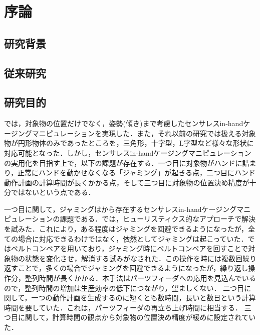 \documentclass[a4paper,twoside,12pt,papersize, dvipdfmx]{iirthesis}
\begin{document}
    \newcommand{\figref}[1]{\figurename\ref{#1}}
    \newcommand{\tabref}[1]{\tablename\ref{#1}}
    \renewcommand{\eqref}[1]{式~(\ref{#1})}
    \newcommand{\chapref}[1]{\ref{#1}章}
    \newcommand{\secref}[1]{\ref{#1}節}
    \newcommand{\ssecref}[1]{\ref{#1}項}
    \newcommand{\appref}[1]{付録\ref{#1}}
\fi


\chapter{序論}\label{chap:intro}
\minitoc

\section{研究背景}\label{sec::intro::background}


\section{従来研究}\label{sec::intro::relatedresearch}


\section{研究目的}\label{sec::intro::objective}
\cite{komiyama2020}では，対象物の位置だけでなく，姿勢(傾き)まで考慮したセンサレスin-handケージングマニピュレーションを実現した．また，それ以前の研究では扱える対象物が円形物体のみであったところを，三角形，十字型，L字型など様々な形状に対応可能となった．しかし，センサレスin-handケージングマニピュレーションの実用化を目指す上で，以下の課題が存在する．一つ目に対象物がハンドに詰まり，正常にハンドを動かせなくなる「ジャミング」が起きる点，二つ目にハンド動作計画の計算時間が長くかかる点，そして三つ目に対象物の位置決め精度が十分ではないという点である．\par

一つ目に関して，ジャミングは\cite{asamura2013}から存在するセンサレスin-handケージングマニピュレーションの課題である．\cite{komiyama2020}では，ヒューリスティクス的なアプローチで解決を試みた．これにより，ある程度はジャミングを回避できるようになったが，全ての場合に対応できるわけではなく，依然としてジャミングは起こっていた．\cite{kamikukita2021}ではベルトコンベアを用いており，ジャミング時にベルトコンベアを回すことで対象物の状態を変化させ，解消する試みがなされた．この操作を時には複数回繰り返すことで，多くの場合でジャミングを回避できるようになったが，繰り返し操作分，整列時間が長くかかる．本手法はパーツフィーダへの応用を見込んでいるので，整列時間の増加は生産効率の低下につながり，望ましくない．
二つ目に関して，一つの動作計画を生成するのに短くとも数時間，長いと数日という計算時間を要していた．これは，パーツフィーダの再立ち上げ時間に相当する．
三つ目に関して，計算時間の観点から対象物の位置決め精度が緩めに設定されていた．\par
\end{document}
